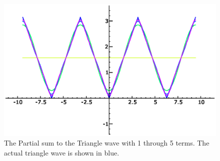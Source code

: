 \begin{ex}
\begin{figure}[h]
\includegraphics[width=\textwidth]{img/2April2008img2.eps}
\caption[Partial Sums of Fourier Expansion of Triangle Wave]{The Partial sum to the Triangle wave with 1 through 5 terms. The actual triangle wave is shown in blue.}
\label{fig:2April2008:triangleWavePartialSum}
\end{figure}



\end{ex}
